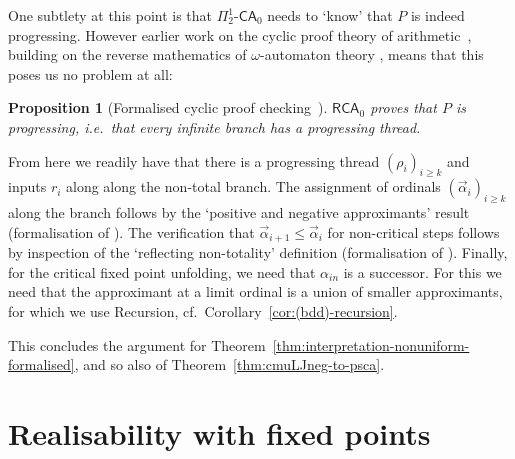 \documentclass[10pt,a4paper]{amsart}
\theoremstyle{plain}
\newtheorem{proposition}[proposition]{Proposition}
\theoremstyle{definition}
\newcommand{\red}[1]{{\color{red}#1}}
\newcommand{\todonew}[1]{{\red{TodoNew: #1}}}
\renewcommand{\todonew}[1]{}
\theoremstyle{plain}
\theoremstyle{definition} %
\newcommand{\closure}[1]{\langle #1 \rangle}
\newcommand{\clomuLJneg}{\closure{\muLJneg}}
\newcommand{\typedclomuLJneg}{\clomuLJneg_{\N,\times,\arrow,\mu}}
\newcommand{\nat}{\mathit{N}}
\newcommand{\N}{\nat} %
\newcommand{\arrow}{\to}
\newcommand{\LJ}{\mathsf{LJ}}
\newcommand{\muLJ}{\mu\LJ}
\newcommand{\muLJneg}{\muLJ^-}
\newcommand{\der}{P}
\newcommand{\Pin}[2]{\Pi^{#1}_{#2}}
\newcommand{\PA}{\mathsf{PA}}
\newcommand{\HA}{\mathsf{HA}}
\newcommand{\muPA}{\mu\PA}
\newcommand{\muHA}{\mu\HA}
\newcommand{\CA}{\mathsf{CA}}
\newcommand{\ca}[1]{#1\text{-}\CA}
\newcommand{\RCA}{\mathsf R \CA_0}
\newcommand{\PSCA}{\ca{\Pin 1 2 }_0}
\newcommand{\pNat}{\mathsf{N}}
\begin{document}
One subtlety at this point is that $\PSCA$ needs to `know' that $\der$ is indeed progressing.
However earlier work on the cyclic proof theory of arithmetic~\cite{Simpson17:cyc-arith,Das20:ca-log-comp}, building on the reverse mathematics of $\omega$-automaton theory \cite{KMPS19:buchi-rev-math}, means that this poses us no problem at all:

\begin{proposition}
    [Formalised cyclic proof checking~\cite{Das20:ca-log-comp}]
    $\RCA$ proves that $P$ is progressing, i.e.\ that every infinite branch has a progressing thread.
\end{proposition}

From here we readily have that there is a progressing thread $(\rho_i)_{i\geq k}$ and inputs $r_i$ along along the non-total branch.
The assignment of ordinals $(\vec\alpha_i)_{i\geq k}$ along the branch follows by the `positive and negative approximants' result (formalisation of ).
The verification that $\vec \alpha_{i+1}\leq \vec \alpha_i$ for non-critical steps follows by inspection of the `reflecting non-totality' definition (formalisation of ).
Finally, for the critical fixed point unfolding, we need that $\alpha_{in}$ is a successor. 
For this we need that the approximant at a limit ordinal is a union of smaller approximants, for which we use Recursion, cf.~Corollary~\ref{cor:(bdd)-recursion}.

\medskip

This concludes the argument for Theorem~\ref{thm:interpretation-nonuniform-formalised}, and so also of Theorem~\ref{thm:cmuLJneg-to-psca}.


\section{Realisability with fixed points}
\label{sec:realisability}
\todonew{
\begin{itemize}
    \item include proof of $\Pi_2$ conservativity of $\muPA$ over $\muHA$ in main text?
    \item switch typesetting of predicate $\pNat$ and type $\nat$ macros?
    \item could make further remarks about abstract realisability just after definition of judgement (some commented copy there).
    \item check and try improve remark about comparison to system F.
    \item at same time can simplify the typed version of $\typedclomuLJneg$ from earlier to be more intuitive.
    \item for functoriality lemma can omit all noncriticial cases?
    \item add comments about abstract realisability inspired by Berger and Tsuiki's appropach, but point out that our realisability model is different as we do not interpret fixed points as fixed points, but are rather inspired by SO encodings.
\end{itemize}
}
\end{document}
